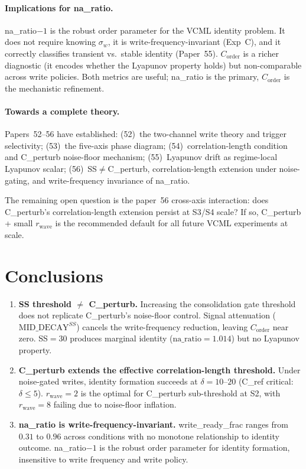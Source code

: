\documentclass[11pt,a4paper]{article}
\newcommand{\Corder}{C_{\mathrm{order}}}
\newcommand{\sw}{\sigma_w}
\newcommand{\na}{\mathrm{na\_ratio}}
\begin{document}
\paragraph{Implications for na\_ratio.}
na\_ratio$-1$ is the robust order parameter for the VCML identity problem.
It does not require knowing $\sw$, it is write-frequency-invariant (Exp~C),
and it correctly classifies transient vs.\ stable identity (Paper~55).
$\Corder$ is a richer diagnostic (it encodes whether the Lyapunov property
holds) but non-comparable across write policies. Both metrics are useful;
na\_ratio is the primary, $\Corder$ is the mechanistic refinement.

\paragraph{Towards a complete theory.}
Papers~52--56 have established: (52)~the two-channel write theory and trigger
selectivity; (53)~the five-axis phase diagram; (54)~correlation-length condition
and C\_perturb noise-floor mechanism; (55)~Lyapunov drift as
regime-local Lyapunov scalar; (56)~SS$\neq$C\_perturb, correlation-length
extension under noise-gating, and write-frequency invariance of na\_ratio.

The remaining open question is the paper~56 cross-axis interaction:
does C\_perturb's correlation-length extension persist at S3/S4 scale?
If so, C\_perturb + small $r_\mathrm{wave}$ is the recommended default
for all future VCML experiments at scale.

\section{Conclusions}

\begin{enumerate}
  \item \textbf{SS threshold $\neq$ C\_perturb.}
    Increasing the consolidation gate threshold does not replicate C\_perturb's
    noise-floor control. Signal attenuation ($\mathrm{MID\_DECAY}^{SS}$) cancels
    the write-frequency reduction, leaving $\Corder$ near zero.
    SS$=30$ produces marginal identity ($\na=1.014$) but no Lyapunov property.

  \item \textbf{C\_perturb extends the effective correlation-length threshold.}
    Under noise-gated writes, identity formation succeeds at $\delta = 10$--$20$
    (C\_ref critical: $\delta \leq 5$). $r_\mathrm{wave}=2$ is the optimal
    for C\_perturb sub-threshold at S2, with $r_\mathrm{wave}=8$ failing due
    to noise-floor inflation.

  \item \textbf{na\_ratio is write-frequency-invariant.}
    write\_ready\_frac ranges from $0.31$ to $0.96$ across conditions with no
    monotone relationship to identity outcome.
    na\_ratio$-1$ is the robust order parameter for identity formation,
    insensitive to write frequency and write policy.
\end{enumerate}
\end{document}
